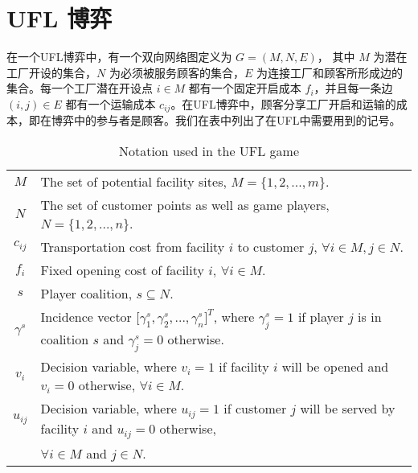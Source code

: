 \documentclass[UTF8]{article}
\begin{document}
\section{UFL 博弈}\label{section:UFL}
在一个UFL博弈中，有一个双向网络图定义为 $G=(M,N,E)$， 其中 $M$ 为潜在工厂开设的集合，$N$ 为必须被服务顾客的集合，$E$ 为连接工厂和顾客所形成边的集合。每一个工厂潜在开设点 $i \in M$ 都有一个固定开启成本 $f_i$，并且每一条边 $(i,j) \in E$ 都有一个运输成本 $c_{ij}$。在UFL博弈中，顾客分享工厂开启和运输的成本，即在博弈中的参与者是顾客。我们在表中列出了在UFL中需要用到的记号。

\begin{table}[H]
\vspace{-2mm}
\tabcolsep=7pt
\small
\renewcommand\arraystretch{1.5}
\caption{\label{table:notationsUFL} Notation used in the UFL game}
\begin{tabular}[!h]{c c}
\hline
\multicolumn{1}{c}{$M$} &\multicolumn{1}{l}{The set of potential facility sites, $M=\big\{1,2,...,m\big\}$.}\\
\multicolumn{1}{c}{$N$} &\multicolumn{1}{l}{The set of customer points as well as game players, $N=\big\{1,2,...,n\big\}$.}\\
\multicolumn{1}{c}{$c_{ij}$} &\multicolumn{1}{l}{Transportation cost from facility $i$ to customer $j$, $\forall i \in M, j \in N$.}\\
\multicolumn{1}{c}{$f_i$} &\multicolumn{1}{l}{Fixed opening cost of facility $i$, $\forall i \in M$.}\\
\multicolumn{1}{c}{$s$} &\multicolumn{1}{l}{Player coalition, $s \subseteq N$.}\\
\multicolumn{1}{c}{$\gamma^s$} &\multicolumn{1}{l}{Incidence vector $\big[ \gamma^{s}_1,\gamma^{s}_2,...,\gamma^{s}_{n}\big]^T$, where $\gamma^{s}_j=1$ if player $j$ is in coalition $s$ and $\gamma^{s}_j=0$ otherwise.}\\
\multicolumn{1}{c}{$v_i$} &\multicolumn{1}{l}{Decision variable, where $v_i=1$ if facility $i$ will be opened and $v_i=0$ otherwise, $\forall i \in M$.}\\
\multicolumn{1}{c}{$u_{ij}$} &\multicolumn{1}{l}{Decision variable, where $u_{ij}=1$ if customer $j$ will be served by facility $i$ and $u_{ij}=0$ otherwise,}\\
\multicolumn{1}{c}{} &\multicolumn{1}{l}{ $\forall i \in M$ and $j \in N$.}\\
\hline
\end{tabular}
\vspace{-3mm}
\end{table}
\end{document}
